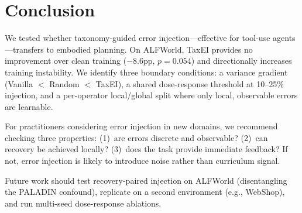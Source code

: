 \section{Conclusion}
\label{sec:conclusion}

We tested whether taxonomy-guided error injection---effective for tool-use agents---transfers to embodied planning. On ALFWorld, TaxEI provides no improvement over clean training ($-8.6$pp, $p{=}0.054$) and directionally increases training instability. We identify three boundary conditions: a variance gradient (Vanilla $<$ Random $<$ TaxEI), a shared dose-response threshold at 10--25\% injection, and a per-operator local/global split where only local, observable errors are learnable.

For practitioners considering error injection in new domains, we recommend checking three properties: (1)~are errors discrete and observable? (2)~can recovery be achieved locally? (3)~does the task provide immediate feedback? If not, error injection is likely to introduce noise rather than curriculum signal.

Future work should test recovery-paired injection on ALFWorld (disentangling the PALADIN confound), replicate on a second environment (e.g., WebShop), and run multi-seed dose-response ablations.
